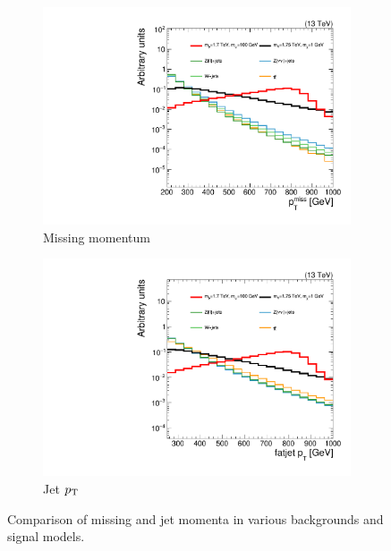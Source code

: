 \begin{figure}[]
    \begin{center}
        \begin{subfigure}[t]{0.49\textwidth}
            \includegraphics[width=\textwidth]{figures/monotop/shapes/signal_pfmet_logy.pdf}
            \caption{Missing momentum}
        \end{subfigure}
        \begin{subfigure}[t]{0.49\textwidth}
            \includegraphics[width=\textwidth]{figures/monotop/shapes/signal_fjPt_0__logy.pdf}
            \caption{Jet $p_\mathrm{T}$}
        \end{subfigure}
        \caption{Comparison of missing and jet momenta in various backgrounds and signal models.}
        \label{fig:mt:bkgshapes}
    \end{center}
\end{figure}

